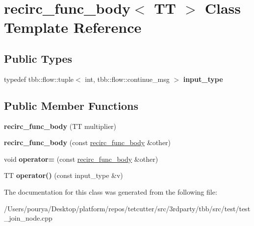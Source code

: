 \hypertarget{classrecirc__func__body}{}\section{recirc\+\_\+func\+\_\+body$<$ T\+T $>$ Class Template Reference}
\label{classrecirc__func__body}
\subsection*{Public Types}
\begin{DoxyCompactItemize}
\item 
\hypertarget{classrecirc__func__body_abb0c43c9b81966eaf80f0efb5ce8a3b1}{}typedef tbb\+::flow\+::tuple$<$ int, tbb\+::flow\+::continue\+\_\+msg $>$ {\bfseries input\+\_\+type}\label{classrecirc__func__body_abb0c43c9b81966eaf80f0efb5ce8a3b1}

\end{DoxyCompactItemize}
\subsection*{Public Member Functions}
\begin{DoxyCompactItemize}
\item 
\hypertarget{classrecirc__func__body_ad0c82c401a32b215ae8b346425ef9858}{}{\bfseries recirc\+\_\+func\+\_\+body} (T\+T multiplier)\label{classrecirc__func__body_ad0c82c401a32b215ae8b346425ef9858}

\item 
\hypertarget{classrecirc__func__body_a4d8fbf622439ed82347aedb5505f9d0d}{}{\bfseries recirc\+\_\+func\+\_\+body} (const \hyperlink{classrecirc__func__body}{recirc\+\_\+func\+\_\+body} \&other)\label{classrecirc__func__body_a4d8fbf622439ed82347aedb5505f9d0d}

\item 
\hypertarget{classrecirc__func__body_a98d30a961b634c189776b761525a4cca}{}void {\bfseries operator=} (const \hyperlink{classrecirc__func__body}{recirc\+\_\+func\+\_\+body} \&other)\label{classrecirc__func__body_a98d30a961b634c189776b761525a4cca}

\item 
\hypertarget{classrecirc__func__body_a0d00ebf17d698c9fd423393bed17f78e}{}T\+T {\bfseries operator()} (const input\+\_\+type \&v)\label{classrecirc__func__body_a0d00ebf17d698c9fd423393bed17f78e}

\end{DoxyCompactItemize}


The documentation for this class was generated from the following file\+:\begin{DoxyCompactItemize}
\item 
/\+Users/pourya/\+Desktop/platform/repos/tetcutter/src/3rdparty/tbb/src/test/test\+\_\+join\+\_\+node.\+cpp\end{DoxyCompactItemize}
